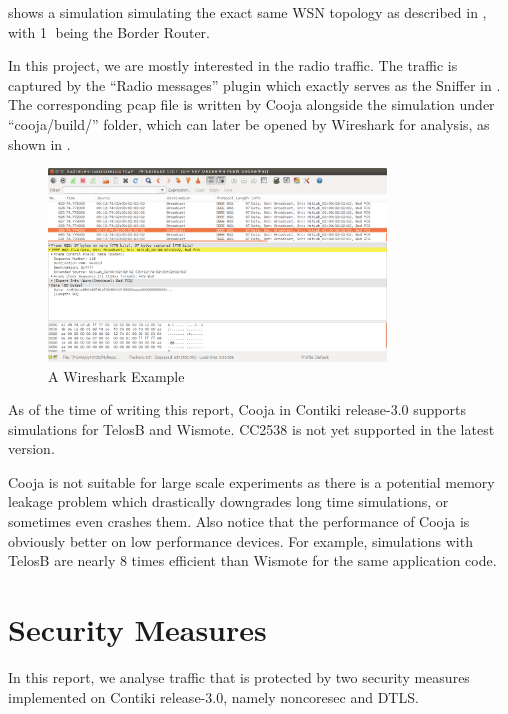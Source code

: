  shows a simulation simulating the exact same WSN topology as described in , with \textcircled{1} being the Border Router. 

In this project, we are mostly interested in the radio traffic. The traffic is captured by the ``Radio messages'' plugin which exactly serves as the Sniffer in . The corresponding pcap file is written by Cooja alongside the simulation under ``cooja/build/'' folder, which can later be opened by Wireshark\cite{Wireshark} for analysis, as shown in .

\begin{figure}[h!]
	\center
	\includegraphics[width=0.8\textwidth]{fig/wireshark_example.png}
	\caption{A Wireshark Example}
	\label{Fig: A Wireshark Example}
\end{figure}

As of the time of writing this report, Cooja in Contiki release-3.0 supports simulations for TelosB and Wismote. CC2538 is not yet supported in the latest version.

Cooja is not suitable for large scale experiments as there is a potential memory leakage problem which drastically downgrades long time simulations, or sometimes even crashes them. Also notice that the performance of Cooja is obviously better on low performance devices. For example, simulations with TelosB are nearly 8 times efficient than Wismote for the same application code.

\section{Security Measures}

In this report, we analyse traffic that is protected by two security measures implemented on Contiki release-3.0, namely noncoresec and DTLS.

